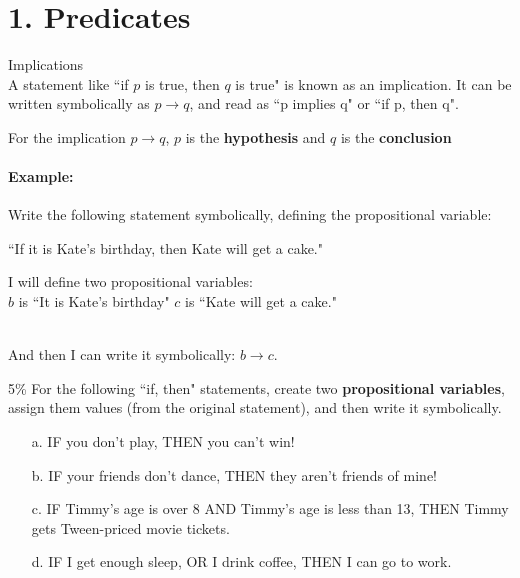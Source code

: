 \documentclass[a4paper,12pt]{book}
\title{}
\author{Rachel Morris}
\date{\today}
\newcounter{question}
\begin{document}
    \togglefalse{answerkey}
    

    \section*{1. Predicates}

        \begin{intro}{Implications} ~\\
            A statement like ``if $p$ is true, then $q$ is true" is known
            as an implication. It can be written symbolically as $p \to q$,
            and read as ``p implies q" or ``if p, then q".

            For the implication $p \to q$, $p$ is the \textbf{hypothesis}
            and $q$ is the \textbf{conclusion}

            \paragraph{Example:} Write the following statement symbolically,
                defining the propositional variable:
                \begin{center} ``If it is Kate's birthday, then Kate will get a cake." \end{center}

                I will define two propositional variables: ~\\
                $b$ is ``It is Kate's birthday" \tab $c$ is ``Kate will get a cake."

                ~\\
                And then I can write it symbolically: $b \to c$.
        \end{intro}

        \begin{question}{\thequestion}{5\%}
            For the following ``if, then" statements, create two
            \textbf{propositional variables}, assign them values (from
            the original statement), and then write it symbolically.

            \begin{enumerate}
                \item[a.] IF you don't play, THEN you can't win!
                \item[b.] IF your friends don't dance, THEN they aren't friends of mine!
                \item[c.] IF Timmy's age is over 8 AND Timmy's age is less than 13, THEN Timmy gets Tween-priced movie tickets.
                \item[d.] IF I get enough sleep, OR I drink coffee, THEN I can go to work.
            \end{enumerate}
        \end{question}
\end{document}
